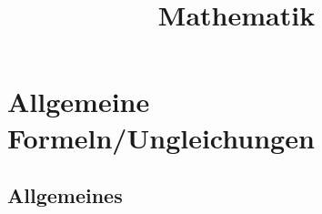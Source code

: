 \documentclass[german]{latex4ei/latex4ei_sheet}
\title{Mathematik}
\begin{document}
\maketitle   %


\section{Allgemeine Formeln/Ungleichungen}
\subsection{Allgemeines} %
\label{sub:allgemeines}
\begin{sectionbox}


\end{sectionbox}
\end{document}
